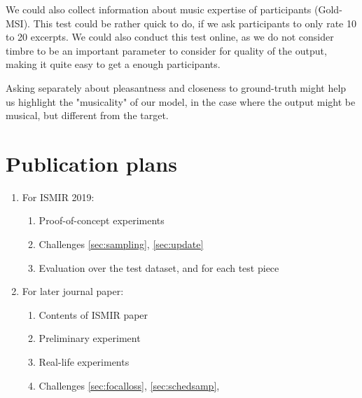 \documentclass{article}
\begin{document}
We could also collect information about music expertise of participants (Gold-MSI).
This test could be rather quick to do, if we ask participants to only rate 10 to 20 excerpts.
We could also conduct this test online, as we do not consider timbre to be an important parameter
to consider for quality of the output, making it quite easy to get a enough participants.

Asking separately about pleasantness and closeness to ground-truth might help us highlight the "musicality" of our model, in the case where the output might be musical, but different from the target.

\section{Publication plans}

\begin{enumerate}
\item For ISMIR 2019: 
	\begin{enumerate}
	\item Proof-of-concept experiments
	\item Challenges \ref{sec:sampling}, \ref{sec:update}
	\item Evaluation over the test dataset, and for each test piece
	\end{enumerate}

\item For later journal paper:
	\begin{enumerate}
	\item Contents of ISMIR paper
	\item Preliminary experiment
	\item Real-life experiments
	\item Challenges \ref{sec:focalloss}, \ref{sec:schedsamp},
	\end{enumerate}
\end{enumerate}



\end{document}
